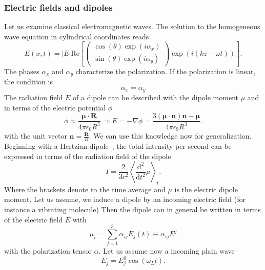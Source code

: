 \subsubsection{Electric fields and dipoles}
\label{ssub:Electricfieldsanddipoles}
Let us examine classical electromagnetic waves. The solution to the homogeneous
wave equation in cylindrical coordinates reads
\begin{equation}
    E(x,t) = |E| \textrm{Re} \left[ \begin{pmatrix}
            \cos(\theta)\exp(i \alpha_x)\\ 
            \sin(\theta)\exp(i \alpha_y)
    \end{pmatrix}\exp(i(kz - \omega t))  \right].
\end{equation}
The phases $\alpha_x$ and $\alpha_y$ characterize the polarization. If the polarization
is linear, the condition is
\begin{equation}
    \alpha_x = \alpha_y 
\end{equation}
The radiation field $E$ of a dipole
can be described with the dipole moment $\mu$ and in terms of the electric potential $\phi$
\begin{equation}
\phi \approx \frac{\mathbold{\mu}\cdot \mathbold{R}}{4\pi\epsilon_0 R^3} \Rightarrow E = - \nabla \phi 
= \frac{3 \mathbold{(\mu \cdot n) n - \mu}}{4 \pi \epsilon_9 R^3}.
\end{equation}
with the unit vector $\textbf{n} = \frac{\textbf{R}}{R}$. We can use this knowledge now for 
generalization.
Beginning with a Hertzian dipole~\cite{koningstein1972introduction}, the total intensity
per second can be expressed in terms of the radiation field of the dipole 
\begin{equation}
    \label{eq:hertz}
   I = \frac{2}{3 c^2} \left \langle \frac{\mathrm{d}^2}{\mathrm{d} t^2}  \mu \right \rangle_t.
\end{equation}
Where the brackets denote to the time average and $\mu$ is the electric dipole moment. Let us assume,
we induce a dipole by an incoming electric field (for instance a vibrating molecule)
Then the dipole can in general be written in terms of the electric field $E$ with
\begin{equation}
    \mu_i = \sum^{3}_{j=1} \alpha_{ij} E_j(t) \equiv \alpha_{ij} E^j 
\end{equation}
with the polarization tensor $\alpha$.
Let us assume now a incoming plain wave 
\begin{equation}
    E_j = E^0_j \cos(\omega_L t).
\end{equation}

